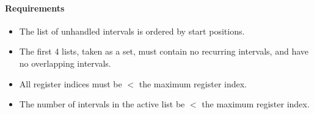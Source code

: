 \documentclass{llncs}
\begin{document}
\paragraph{Requirements}

\begin{itemize}
\item The list of unhandled intervals is ordered by start positions.
\item The first 4 lists, taken as a set, must contain no recurring
  intervals, and have no overlapping intervals.
\item All register indices must be $<$ the maximum register index.
\item The number of intervals in the active list be $<$ the maximum register
  index.
\end{itemize}




\end{document}
